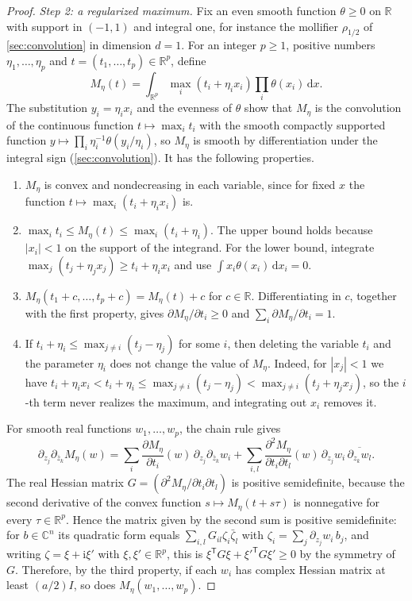 \begin{proof}
\emph{Step 2: a regularized maximum.} Fix an even smooth function $\theta\ge0$ on $\mathbb R$ with support in $(-1,1)$ and integral one, for instance the mollifier $\rho_{1/2}$ of \cref{sec:convolution} in dimension $d=1$. For an integer $p\ge1$, positive numbers $\eta_1,\ldots,\eta_p$ and $t=(t_1,\ldots,t_p)\in\mathbb R^p$, define
\[
 M_\eta(t)=\int_{\mathbb R^p}\max_i(t_i+\eta_i x_i)
                         \prod_i\theta(x_i)\,\mathrm dx.
\]
The substitution $y_i=\eta_ix_i$ and the evenness of $\theta$ show that $M_\eta$ is the convolution of the continuous function $t\mapsto\max_it_i$ with the smooth compactly supported function $y\mapsto\prod_i\eta_i^{-1}\theta(y_i/\eta_i)$, so $M_\eta$ is smooth by differentiation under the integral sign (\cref{sec:convolution}). It has the following properties.
\begin{enumerate}
\item $M_\eta$ is convex and nondecreasing in each variable, since for fixed $x$ the function $t\mapsto\max_i(t_i+\eta_ix_i)$ is.
\item $\max_it_i\le M_\eta(t)\le\max_i(t_i+\eta_i)$. The upper bound holds because $|x_i|<1$ on the support of the integrand. For the lower bound, integrate $\max_j(t_j+\eta_jx_j)\ge t_i+\eta_ix_i$ and use $\int x_i\theta(x_i)\,\mathrm dx_i=0$.
\item $M_\eta(t_1+c,\ldots,t_p+c)=M_\eta(t)+c$ for $c\in\mathbb R$. Differentiating in $c$, together with the first property, gives $\partial M_\eta/\partial t_i\ge0$ and $\sum_i\partial M_\eta/\partial t_i=1$.
\item If $t_i+\eta_i\le\max_{j\ne i}(t_j-\eta_j)$ for some $i$, then deleting the variable $t_i$ and the parameter $\eta_i$ does not change the value of $M_\eta$. Indeed, for $|x_j|<1$ we have $t_i+\eta_ix_i<t_i+\eta_i\le\max_{j\ne i}(t_j-\eta_j)<\max_{j\ne i}(t_j+\eta_jx_j)$, so the $i$-th term never realizes the maximum, and integrating out $x_i$ removes it.
\end{enumerate}
For smooth real functions $w_1,\ldots,w_p$, the chain rule gives
\[
 \partial_{z_j}\partial_{\bar z_k}M_\eta(w)=\sum_i\frac{\partial M_\eta}{\partial t_i}(w)\,\partial_{z_j}\partial_{\bar z_k}w_i+\sum_{i,l}\frac{\partial^2M_\eta}{\partial t_i\partial t_l}(w)\,\partial_{z_j}w_i\,\overline{\partial_{z_k}w_l}.
\]
The real Hessian matrix $G=(\partial^2M_\eta/\partial t_i\partial t_l)$ is positive semidefinite, because the second derivative of the convex function $s\mapsto M_\eta(t+s\tau)$ is nonnegative for every $\tau\in\mathbb R^p$. Hence the matrix given by the second sum is positive semidefinite: for $b\in\mathbb C^n$ its quadratic form equals $\sum_{i,l}G_{il}\zeta_i\bar\zeta_l$ with $\zeta_i=\sum_j\partial_{z_j}w_i\,b_j$, and writing $\zeta=\xi+\mathrm i\xi'$ with $\xi,\xi'\in\mathbb R^p$, this is $\xi^{\mathsf T}G\xi+\xi'^{\mathsf T}G\xi'\ge0$ by the symmetry of $G$. Therefore, by the third property, if each $w_i$ has complex Hessian matrix at least $(a/2)I$, so does $M_\eta(w_1,\ldots,w_p)$.


\end{proof}
